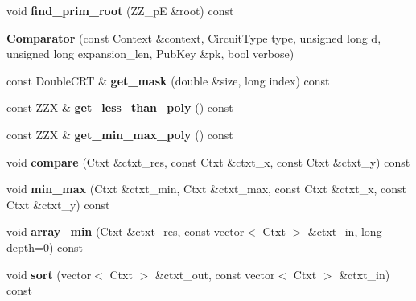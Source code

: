 \begin{DoxyCompactItemize}
\mbox{\label{classhe__cmp_1_1Comparator_a49602038349ea0c81e9b1f2230ed8784}} 
void {\bfseries find\+\_\+prim\+\_\+root} (Z\+Z\+\_\+pE \&root) const
\item 
\mbox{\label{classhe__cmp_1_1Comparator_ab5328a4d459c30e6de588fefcf67255e}} 
{\bfseries Comparator} (const Context \&context, Circuit\+Type type, unsigned long d, unsigned long expansion\+\_\+len, Pub\+Key \&pk, bool verbose)
\item 
\mbox{\label{classhe__cmp_1_1Comparator_aa6b0fa108dba9e06bc9cd68cbe396789}} 
const Double\+C\+RT \& {\bfseries get\+\_\+mask} (double \&size, long index) const
\item 
\mbox{\label{classhe__cmp_1_1Comparator_aeb83a2f26ff8d242a842f870d4a99c3d}} 
const Z\+ZX \& {\bfseries get\+\_\+less\+\_\+than\+\_\+poly} () const
\item 
\mbox{\label{classhe__cmp_1_1Comparator_a471ba3b3f42a2ebaba667c71e6a2f85a}} 
const Z\+ZX \& {\bfseries get\+\_\+min\+\_\+max\+\_\+poly} () const
\item 
\mbox{\label{classhe__cmp_1_1Comparator_ac9d53561518ee596c0af519941b69fd6}} 
void {\bfseries compare} (Ctxt \&ctxt\+\_\+res, const Ctxt \&ctxt\+\_\+x, const Ctxt \&ctxt\+\_\+y) const
\item 
\mbox{\label{classhe__cmp_1_1Comparator_a097a86149fd0fb432d20ef09ce14a825}} 
void {\bfseries min\+\_\+max} (Ctxt \&ctxt\+\_\+min, Ctxt \&ctxt\+\_\+max, const Ctxt \&ctxt\+\_\+x, const Ctxt \&ctxt\+\_\+y) const
\item 
\mbox{\label{classhe__cmp_1_1Comparator_acb36cddbe203d968d876f56949a1b349}} 
void {\bfseries array\+\_\+min} (Ctxt \&ctxt\+\_\+res, const vector$<$ Ctxt $>$ \&ctxt\+\_\+in, long depth=0) const
\item 
\mbox{\label{classhe__cmp_1_1Comparator_a2a2046a2a750a7a5c176b07ef744b4a3}} 
void {\bfseries sort} (vector$<$ Ctxt $>$ \&ctxt\+\_\+out, const vector$<$ Ctxt $>$ \&ctxt\+\_\+in) const
\end{DoxyCompactItemize}
